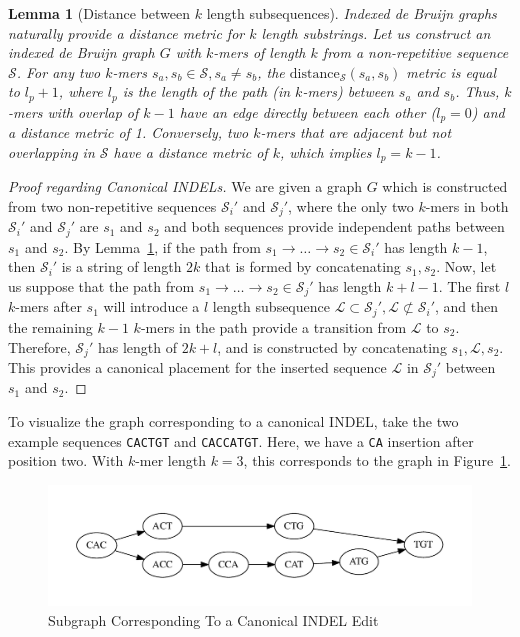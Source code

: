 \documentclass[masters]{ucbthesis}
\newtheorem{lemma}{Lemma}
\begin{document}
\begin{lemma}[Distance between $k$ length subsequences]
\label{lem:minimum-distance}
\emph{Indexed de Bruijn} graphs naturally provide a distance metric for $k$ length substrings. Let us construct an
\emph{indexed de Bruijn} graph $G$ with $k$-mers of length $k$ from a non-repetitive sequence $\mathcal{S}$.
For any two $k$-mers $s_a, s_b \in \mathcal{S}, s_a \ne s_b$, the
$\text{distance}_\mathcal{S}(s_a, s_b)$ metric is equal to $l_p + 1$, where $l_p$ is the length of the
path (in $k$-mers) between $s_a$ and $s_b$. Thus, $k$-mers with overlap of $k - 1$ have an edge
directly between each other ($l_p = 0$) and a distance metric of 1. Conversely, two $k$-mers that are
adjacent but not overlapping in $\mathcal{S}$ have a distance metric of $k$, which implies $l_p = k - 1$.
\end{lemma}

\begin{proof}[Proof regarding Canonical INDELs]
\label{proof:canonical-indels}
We are given a graph $G$ which is constructed from two non-repetitive sequences $\mathcal{S}_i'$ and
$\mathcal{S}_j'$, where the only two $k$-mers in both $\mathcal{S}_i'$ and $\mathcal{S}_j'$ are $s_1$
and $s_2$ and both sequences provide independent paths between $s_1$ and $s_2$. By
Lemma~\ref{lem:minimum-distance}, if the path from $s_1 \rightarrow \dots \rightarrow s_2 \in
\mathcal{S}_i'$ has length $k - 1$, then $\mathcal{S}_i'$ is a string of length $2k$ that is formed by
concatenating $s_1, s_2$. Now, let us suppose that the path from $s_1 \rightarrow \dots \rightarrow s_2
\in \mathcal{S}_j'$ has length $k + l - 1$. The first $l$ $k$-mers after $s_1$ will introduce a $l$ length
subsequence $\mathcal{L} \subset \mathcal{S}_j', \mathcal{L} \not\subset \mathcal{S}_i'$, and then the
remaining $k - 1$ $k$-mers in the path provide a transition from $\mathcal{L}$ to $s_2$. Therefore,
$\mathcal{S}_j'$ has length of $2k + l$, and is constructed by concatenating $s_1, \mathcal{L}, s_2$.
This provides a canonical placement for the inserted sequence $\mathcal{L}$ in $\mathcal{S}_j'$ between
$s_1$ and $s_2$.
\end{proof}

To visualize the graph corresponding to a canonical INDEL, take the two example sequences
\texttt{CACTGT} and \texttt{CACCATGT}. Here, we have a \texttt{CA} insertion after position two. With
$k$-mer length $k = 3$, this corresponds to the graph in Figure~\ref{fig:indel}.

\begin{figure}[h]
\begin{center}
\includegraphics[width=0.5\linewidth, clip=true, trim=0 39 0 39]{graphs/indel.pdf}
\end{center}
\caption{Subgraph Corresponding To a Canonical INDEL Edit}
\label{fig:indel}
\end{figure}
\end{document}
